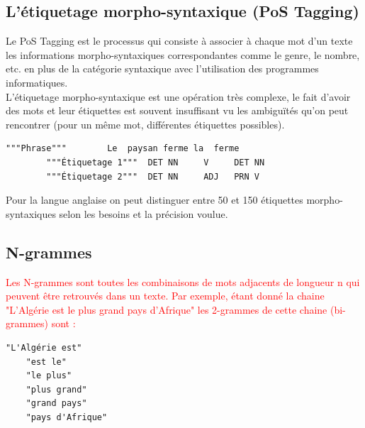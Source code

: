     \subsection{L'étiquetage morpho-syntaxique (PoS Tagging)}
    Le PoS Tagging est le processus qui consiste à associer à chaque mot d'un texte les informations morpho-syntaxiques correspondantes comme le genre, le nombre, etc. en plus de la catégorie syntaxique avec l'utilisation des programmes informatiques.\\
    L'étiquetage morpho-syntaxique est une opération très complexe, le fait d'avoir des mots et leur étiquettes est souvent insuffisant vu les ambiguïtés qu'on peut rencontrer (pour un même mot, différentes étiquettes possibles).
    \begin{lstlisting}[style=code]
        """Phrase"""        Le  paysan ferme la  ferme
        """Étiquetage 1"""  DET NN     V     DET NN
        """Étiquetage 2"""  DET NN     ADJ   PRN V
    \end{lstlisting}
    Pour la langue anglaise on peut distinguer entre 50 et 150 étiquettes morpho-syntaxiques selon les besoins et la précision voulue.
    
   
    \subsection{N-grammes}
     \textcolor{red}{Les N-grammes sont toutes les combinaisons de mots adjacents de longueur n qui peuvent être retrouvés dans un texte. Par exemple, étant donné la chaine "L'Algérie est le plus grand pays d'Afrique" les 2-grammes de cette chaine (bi-grammes) sont :}
    
    \begin{lstlisting}[style=code]
    "L'Algérie est"  
    "est le" 
    "le plus"
    "plus grand"
    "grand pays"
    "pays d'Afrique"
    \end{lstlisting}
    
